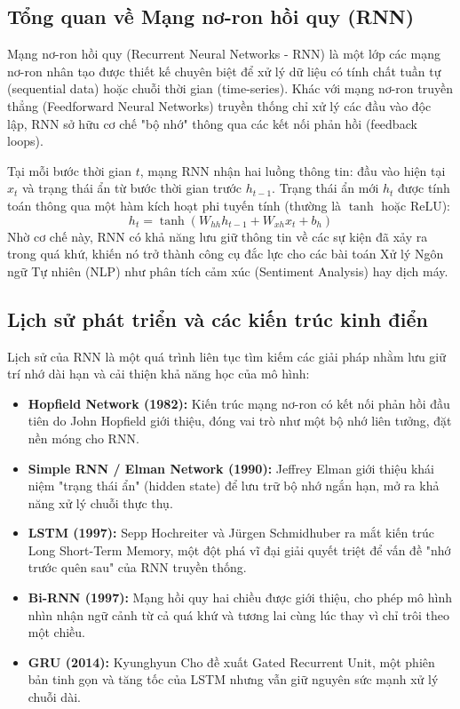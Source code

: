 \subsection{Tổng quan về Mạng nơ-ron hồi quy (RNN)}
Mạng nơ-ron hồi quy (Recurrent Neural Networks - RNN) là một lớp các mạng nơ-ron nhân tạo được thiết kế chuyên biệt để xử lý dữ liệu có tính chất tuần tự (sequential data) hoặc chuỗi thời gian (time-series). Khác với mạng nơ-ron truyền thẳng (Feedforward Neural Networks) truyền thống chỉ xử lý các đầu vào độc lập, RNN sở hữu cơ chế "bộ nhớ" thông qua các kết nối phản hồi (feedback loops). 

Tại mỗi bước thời gian $t$, mạng RNN nhận hai luồng thông tin: đầu vào hiện tại $x_t$ và trạng thái ẩn từ bước thời gian trước $h_{t-1}$. Trạng thái ẩn mới $h_t$ được tính toán thông qua một hàm kích hoạt phi tuyến tính (thường là $\tanh$ hoặc $\text{ReLU}$):
\begin{equation}
    h_t = \tanh(W_{hh} h_{t-1} + W_{xh} x_t + b_h)
\end{equation}
Nhờ cơ chế này, RNN có khả năng lưu giữ thông tin về các sự kiện đã xảy ra trong quá khứ, khiến nó trở thành công cụ đắc lực cho các bài toán Xử lý Ngôn ngữ Tự nhiên (NLP) như phân tích cảm xúc (Sentiment Analysis) hay dịch máy.

\subsection{Lịch sử phát triển và các kiến trúc kinh điển}
Lịch sử của RNN là một quá trình liên tục tìm kiếm các giải pháp nhằm lưu giữ trí nhớ dài hạn và cải thiện khả năng học của mô hình:
\begin{itemize}
    \item \textbf{Hopfield Network (1982):} Kiến trúc mạng nơ-ron có kết nối phản hồi đầu tiên do John Hopfield giới thiệu, đóng vai trò như một bộ nhớ liên tưởng, đặt nền móng cho RNN.
    \item \textbf{Simple RNN / Elman Network (1990):} Jeffrey Elman giới thiệu khái niệm "trạng thái ẩn" (hidden state) để lưu trữ bộ nhớ ngắn hạn, mở ra khả năng xử lý chuỗi thực thụ.
    \item \textbf{LSTM (1997):} Sepp Hochreiter và Jürgen Schmidhuber ra mắt kiến trúc Long Short-Term Memory, một đột phá vĩ đại giải quyết triệt để vấn đề "nhớ trước quên sau" của RNN truyền thống.
    \item \textbf{Bi-RNN (1997):} Mạng hồi quy hai chiều được giới thiệu, cho phép mô hình nhìn nhận ngữ cảnh từ cả quá khứ và tương lai cùng lúc thay vì chỉ trôi theo một chiều.
    \item \textbf{GRU (2014):} Kyunghyun Cho đề xuất Gated Recurrent Unit, một phiên bản tinh gọn và tăng tốc của LSTM nhưng vẫn giữ nguyên sức mạnh xử lý chuỗi dài.
\end{itemize}

